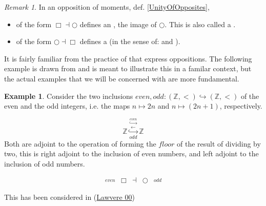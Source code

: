 \documentclass[12pt,titlepage]{article}
\newcommand{\itexarray}[1]{\begin{matrix}#1\end{matrix}}
\newcommand{\lt}{<}
\theoremstyle{plain}
\theoremstyle{definition}
\newtheorem{example}{Example}
\theoremstyle{remark}
\newtheorem{remark}{Remark}
\begin{document}
\begin{remark}
\label{}\hypertarget{}{}
In  an opposition of moments, def. \ref{UnityOfOpposites},

\begin{itemize}%
\item of the form $\Box \dashv \bigcirc$ defines an  , the image of $\bigcirc$. This is also called a .


\item of the form $\bigcirc \dashv \Box$ defines a  (in the sense of:  and ).



\end{itemize}
\end{remark}
It is fairly familiar from the practice of  that  express oppositions. The following example is drawn from  and is meant to illustrate this in a familar context, but the actual examples that we will be concerned with are more fundamental.

\begin{example}
\label{}\hypertarget{}{}
Consider the two inclusions $even, odd \colon (\mathbb{Z},\lt ) \hookrightarrow (\mathbb{Z},\lt)$ of the even and the odd integers, i.e. the maps $n \mapsto 2 n$ and $n \mapsto (2n+1)$, respectively.

\begin{displaymath}
\mathbb{Z}
  \stackrel{\overset{even}{\hookrightarrow}}{\stackrel{\longleftarrow}{\underset{odd}{\hookrightarrow}}}
  \mathbb{Z}
\end{displaymath}
Both are adjoint to the operation of forming the $floor$ of the result of dividing by two, this is right adjoint to the inclusion of even numbers, and left adjoint to the inclusion of odd numbers.

\begin{displaymath}
\itexarray{
    \stackrel{even}{} & \Box &\dashv& \bigcirc & \stackrel{odd}{}
  }
\end{displaymath}
\end{example}
This has been considered in (\href{http://ncatlab.org/nlab/show/Aufhebung#Law00}{Lawvere 00})
\end{document}
